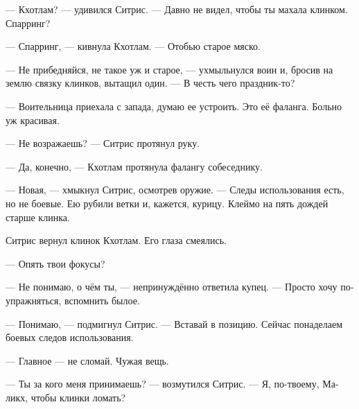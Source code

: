 \documentclass[a4paper,12pt,fleqn]{book}\usepackage{cooltooltips}\usepackage{polyglossia}\setdefaultlanguage{russian}\setotherlanguage{english}\defaultfontfeatures{Ligatures=TeX,Mapping=tex-text} \usepackage{xcolor}\definecolor{lightgray}{HTML}{bbbbbb}\color{lightgray}\newcommand{\ml}[3]{\textenglish{\textcolor{black}{#3}}}
\begin{document}
--- Кхотлам? --- удивился Ситрис.
--- Давно не видел, чтобы ты махала клинком.
Спарринг?

--- Спарринг, — кивнула Кхотлам.
--- Отобью старое мяско.

--- Не прибедняйся, не такое уж и старое, --- ухмыльнулся воин и, бросив на землю связку клинков, вытащил один.
--- В честь чего праздник-то?

--- Воительница приехала с запада, думаю ее устроить.
Это её фаланга.
Больно уж красивая.

--- Не возражаешь? --- Ситрис протянул руку.

--- Да, конечно, --- Кхотлам протянула фалангу собеседнику.

--- Новая, --- хмыкнул Ситрис, осмотрев оружие.
--- Следы использования есть, но не боевые.
Ею рубили ветки и, кажется, курицу.
Клеймо на пять дождей старше клинка.

Ситрис вернул клинок Кхотлам.
Его глаза смеялись.

--- Опять твои фокусы?

--- Не понимаю, о чём ты, --- непринуждённо ответила купец.
--- Просто хочу поупражняться, вспомнить былое.

--- Понимаю, --- подмигнул Ситрис. 
--- Вставай в позицию.
Сейчас понаделаем боевых следов использования.

--- Главное --- не сломай.
Чужая вещь.

--- Ты за кого меня принимаешь? --- возмутился Ситрис.
--- Я, по-твоему, Маликх, чтобы клинки ломать?
\end{document}
